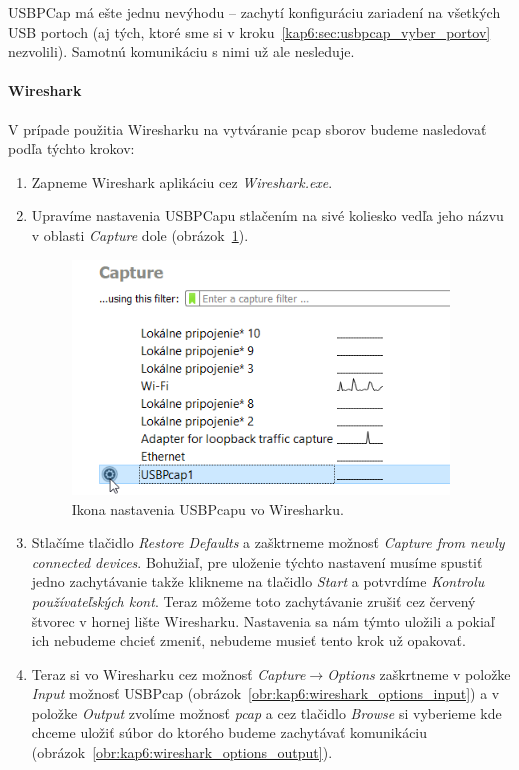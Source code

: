 USBPCap má ešte jednu nevýhodu -- zachytí konfiguráciu zariadení na všetkých USB portoch (aj tých, ktoré sme si v kroku~\ref{kap6:sec:usbpcap_vyber_portov} nezvolili). Samotnú komunikáciu s nimi už ale nesleduje.

\paragraph{Wireshark}
\label{kap6:sec:wireshark:file_capture}
V prípade použitia Wiresharku na vytváranie pcap sborov budeme nasledovať podľa týchto krokov:
\begin{enumerate}
\item Zapneme Wireshark aplikáciu cez \textit{Wireshark.exe}.
\item Upravíme nastavenia USBPCapu stlačením na sivé koliesko vedľa jeho názvu v oblasti \textit{Capture} dole (obrázok~\ref{obr:kap6:wireshark_usbpcap_settings}).

\begin{figure}[!htb]
	\centering
	\includegraphics[width=10cm]{img/kap06_wireshark_usbpcap_settings}
	\caption{Ikona nastavenia USBPcapu vo Wiresharku.}
	\label{obr:kap6:wireshark_usbpcap_settings}
\end{figure}

\item Stlačíme tlačidlo \textit{Restore Defaults} a zašktrneme možnosť \textit{Capture from newly connected devices}. Bohužiaľ, pre uloženie týchto nastavení musíme spustiť jedno zachytávanie takže klikneme na tlačidlo \textit{Start} a potvrdíme \textit{Kontrolu používateľských kont}. Teraz môžeme toto zachytávanie zrušiť cez červený štvorec v hornej lište Wiresharku. Nastavenia sa nám týmto uložili a pokiaľ ich nebudeme chcieť zmeniť, nebudeme musieť tento krok už opakovať.
\item Teraz si vo Wiresharku cez možnosť \textit{Capture}$\rightarrow$\textit{Options} zaškrtneme v položke \textit{Input} možnosť USBPcap (obrázok~\ref{obr:kap6:wireshark_options_input}) a v položke \textit{Output} zvolíme možnosť \textit{pcap} a cez tlačidlo \textit{Browse} si vyberieme kde chceme uložiť súbor do ktorého budeme zachytávať komunikáciu (obrázok~\ref{obr:kap6:wireshark_options_output}).


\end{enumerate}
